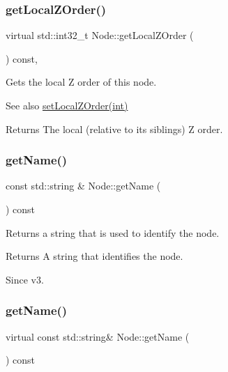\subsubsection{\texorpdfstring{get\+Local\+Z\+Order()}{getLocalZOrder()}\hspace{0.1cm}{\footnotesize\ttfamily [2/2]}}
{\footnotesize\ttfamily virtual std\+::int32\+\_\+t Node\+::get\+Local\+Z\+Order (\begin{DoxyParamCaption}{ }\end{DoxyParamCaption}) const\hspace{0.3cm}{\ttfamily [inline]}, {\ttfamily [virtual]}}

Gets the local Z order of this node.

\begin{DoxySeeAlso}{See also}
{\ttfamily \hyperlink{classNode_aee4e616c2d55b722226aae1e68b4946f}{set\+Local\+Z\+Order(int)}}
\end{DoxySeeAlso}
\begin{DoxyReturn}{Returns}
The local (relative to its siblings) Z order. 
\end{DoxyReturn}
\mbox{\label{classNode_a2ddaa1e6fdada0bec680128d9e732162}} 
\subsubsection{\texorpdfstring{get\+Name()}{getName()}\hspace{0.1cm}{\footnotesize\ttfamily [1/2]}}
{\footnotesize\ttfamily const std\+::string \& Node\+::get\+Name (\begin{DoxyParamCaption}{ }\end{DoxyParamCaption}) const\hspace{0.3cm}{\ttfamily [virtual]}}

Returns a string that is used to identify the node. \begin{DoxyReturn}{Returns}
A string that identifies the node.
\end{DoxyReturn}
\begin{DoxySince}{Since}
v3. 
\end{DoxySince}
\mbox{\label{classNode_a484b1fc5cd08d0b422fc4051b125ea44}} 
\subsubsection{\texorpdfstring{get\+Name()}{getName()}\hspace{0.1cm}{\footnotesize\ttfamily [2/2]}}
{\footnotesize\ttfamily virtual const std\+::string\& Node\+::get\+Name (\begin{DoxyParamCaption}{ }\end{DoxyParamCaption}) const\hspace{0.3cm}{\ttfamily [virtual]}}

